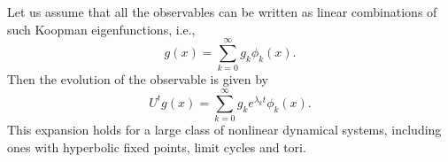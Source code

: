 \documentclass{article}
\begin{document}
Let us assume that all the observables can be written as linear combinations of
such Koopman eigenfunctions, i.e.,
\begin{equation}
    g(x) = \sum_{k=0}^{\infty}g_k \phi_k(x).
\end{equation}
Then the evolution of the observable is given by
\begin{equation}
    U^t g(x) = \sum_{k=0}^{\infty}g_k e^{\lambda_k t} \phi_k(x).
\end{equation}
This expansion holds for a large class of nonlinear dynamical systems,
including ones with hyperbolic fixed points, limit cycles and tori.
\end{document}
